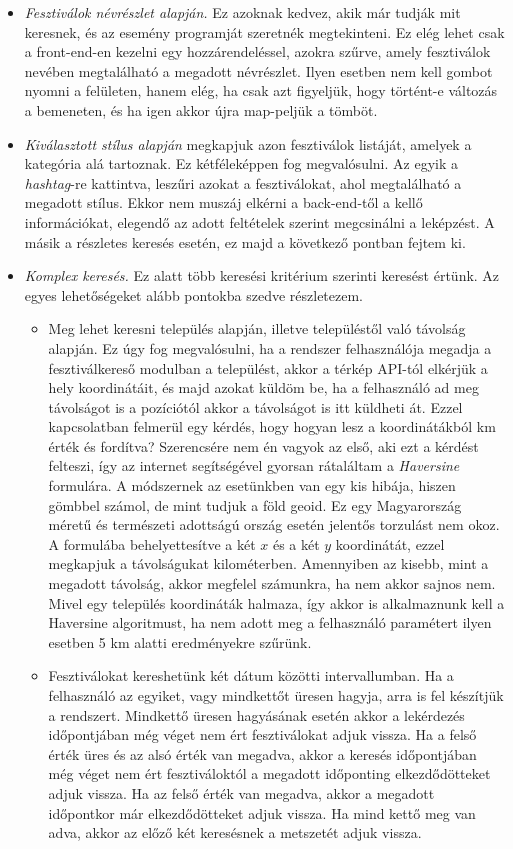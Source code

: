 \begin{itemize}
\item \textit{Fesztiválok névrészlet alapján.}  Ez azoknak kedvez, akik már tudják mit keresnek, és az esemény programját szeretnék megtekinteni. Ez elég lehet csak a front-end-en kezelni egy hozzárendeléssel, azokra szűrve, amely fesztiválok nevében megtalálható a megadott névrészlet. Ilyen esetben nem kell gombot nyomni a felületen, hanem elég, ha csak azt figyeljük, hogy történt-e változás a bemeneten, és ha igen akkor újra map-peljük a tömböt.

\item \textit{Kiválasztott stílus alapján} megkapjuk azon fesztiválok listáját, amelyek a kategória alá tartoznak. Ez kétféleképpen fog megvalósulni. Az egyik a \textit{hashtag}-re kattintva, leszűri azokat a fesztiválokat, ahol megtalálható a megadott stílus. Ekkor nem muszáj elkérni a back-end-től a kellő információkat, elegendő az adott feltételek szerint megcsinálni a leképzést. A másik a részletes keresés esetén, ez majd a következő pontban fejtem ki.

\item \textit{Komplex keresés.} Ez alatt több keresési kritérium szerinti keresést értünk. Az egyes lehetőségeket alább pontokba szedve részletezem.
\begin{itemize}
\item Meg lehet keresni település alapján, illetve településtől való távolság alapján. Ez úgy fog megvalósulni, ha a rendszer felhasználója megadja a fesztiválkereső modulban a települést, akkor a térkép API-tól elkérjük a hely koordinátáit, és majd azokat küldöm be, ha a felhasználó ad meg távolságot is a pozíciótól akkor a távolságot is itt küldheti át. Ezzel kapcsolatban felmerül egy kérdés, hogy hogyan lesz a koordinátákból km érték és fordítva? Szerencsére nem én vagyok az első, aki ezt a kérdést felteszi, így az internet segítségével gyorsan rátaláltam a \textit{Haversine} formulára. A módszernek az esetünkben van egy kis hibája, hiszen gömbbel számol, de mint tudjuk a föld geoid. Ez egy Magyarország méretű és természeti adottságú ország esetén jelentős torzulást nem okoz. A formulába behelyettesítve a két $x$ és a két $y$ koordinátát, ezzel megkapjuk a távolságukat kilométerben. Amennyiben az kisebb, mint a megadott távolság, akkor megfelel számunkra, ha nem akkor sajnos nem. Mivel egy település koordináták halmaza, így akkor is alkalmaznunk kell a Haversine algoritmust, ha nem adott meg a felhasználó paramétert ilyen esetben 5 km alatti eredményekre szűrünk. 

\item Fesztiválokat kereshetünk két dátum közötti intervallumban. Ha a felhasználó az egyiket, vagy mindkettőt üresen hagyja, arra is fel készítjük a rendszert. Mindkettő üresen hagyásának esetén akkor a lekérdezés időpontjában még véget nem ért fesztiválokat adjuk vissza. Ha a felső érték üres és az alsó érték van megadva, akkor a keresés időpontjában még véget nem ért fesztiváloktól a megadott időponting elkezdődötteket adjuk vissza. Ha az felső érték van megadva, akkor a megadott időpontkor már elkezdődötteket adjuk vissza. Ha mind kettő meg van adva, akkor az előző két keresésnek a metszetét adjuk vissza.


\end{itemize}
\end{itemize}
